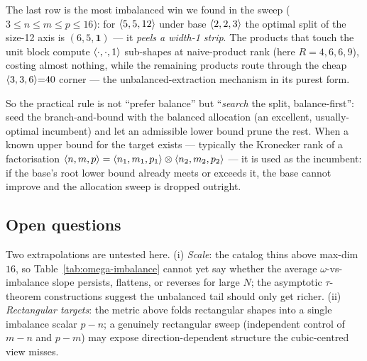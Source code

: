 The last row is the most imbalanced win we found in the sweep
(\(3 \le n \le m \le p \le 16\)): for \(\langle 5, 5, 12 \rangle\) under base
\(\langle 2, 2, 3 \rangle\) the optimal split of the size-12 axis is
\((6,5,\mathbf{1})\) --- it \emph{peels a width-1 strip}. The products that
touch the unit block compute \(\langle \cdot, \cdot, 1 \rangle\) sub-shapes at
naive-product rank (here \(R = 4, 6, 6, 9\)), costing almost nothing, while
the remaining products route through the cheap \(\langle 3, 3, 6 \rangle{=}40\)
corner --- the unbalanced-extraction mechanism in its purest form.

So the practical rule is not ``prefer balance'' but ``\emph{search} the split,
balance-first'': seed the branch-and-bound with the balanced allocation (an
excellent, usually-optimal incumbent) and let an admissible lower bound prune
the rest. When a known upper bound for the target exists --- typically the
Kronecker rank of a factorisation \(\langle n, m, p \rangle =
\langle n_1, m_1, p_1 \rangle\otimes\langle n_2, m_2, p_2 \rangle\) --- it is used as the
incumbent: if the base's root lower bound already meets or exceeds it, the base
cannot improve and the allocation sweep is dropped outright.

\subsection{Open questions}
\label{ssec:balance-open}

Two extrapolations are untested here. (i) \emph{Scale}: the catalog thins above
max-dim \(16\), so Table~\ref{tab:omega-imbalance} cannot yet say whether the
average \(\omega\)-vs-imbalance slope persists, flattens, or reverses for large
\(N\); the asymptotic \(\tau\)-theorem constructions suggest the unbalanced tail
should only get richer. (ii) \emph{Rectangular targets}: the metric above
folds rectangular shapes into a single imbalance scalar \(p-n\); a genuinely
rectangular sweep (independent control of \(m-n\) and \(p-m\)) may expose
direction-dependent structure the cubic-centred view misses.
